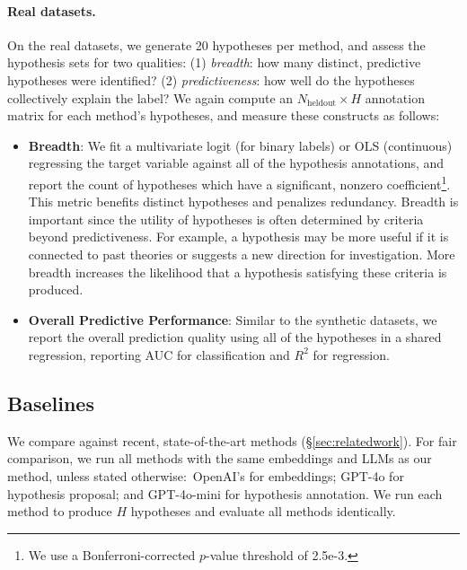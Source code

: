 \paragraph{Real datasets.} On the real datasets, we generate 20 hypotheses per method, and assess the hypothesis sets for two qualities: (1) \textit{breadth}: how many distinct, predictive hypotheses were identified? (2) \textit{predictiveness}: how well do the hypotheses collectively explain the label? 
We again compute an $N_{\text{heldout}} \times H$ annotation matrix for each method's hypotheses, and measure these constructs as follows: 
\begin{itemize}
    \item \textbf{Breadth}: We fit a multivariate logit (for binary labels) or OLS (continuous) regressing the target variable against all of the hypothesis annotations, and report the count of hypotheses which have a significant, nonzero coefficient\footnote{We use a Bonferroni-corrected $p$-value threshold of 2.5e-3.}. 
    This metric benefits distinct hypotheses and penalizes redundancy. 
    Breadth is important since the utility of hypotheses is often determined by criteria beyond predictiveness. 
    For example, a hypothesis may be more useful if it is connected to past theories or suggests a new direction for investigation. More breadth increases the likelihood that a hypothesis satisfying these criteria is produced.
    \item \textbf{Overall Predictive Performance}: Similar to the synthetic datasets, we report the overall prediction quality using all of the hypotheses in a shared regression, reporting AUC for classification and $R^2$ for regression.
\end{itemize}



\subsection{Baselines} 
\label{sec:baselines}



We compare \ourmethod against recent, state-of-the-art methods (\S\ref{sec:relatedwork}). 
For fair comparison, we run all methods with the same embeddings and LLMs as our method, unless stated otherwise:~OpenAI's \embeddingmodel for embeddings; GPT-4o for hypothesis proposal; and GPT-4o-mini for hypothesis annotation.
We run each method to produce $H$ hypotheses and evaluate all methods identically.

